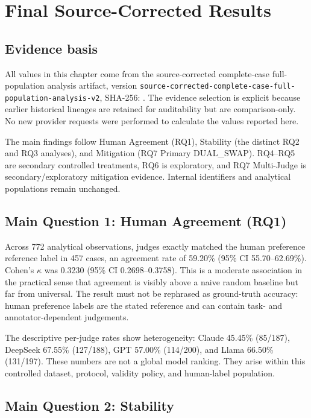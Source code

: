 \chapter{Final Source-Corrected Results}
\label{ch:results}

\section{Evidence basis}

All values in this chapter come from the source-corrected complete-case full-population analysis artifact, version \texttt{source-corrected-complete-case-full-population-analysis-v2}, SHA-256:
\newline {\footnotesize \artifacthash}.
The evidence selection is explicit because earlier historical lineages are retained for auditability but are comparison-only. No new provider requests were performed to calculate the values reported here.

The main findings follow Human Agreement (RQ1), Stability (the distinct RQ2 and RQ3 analyses), and Mitigation (RQ7 Primary DUAL\_SWAP). RQ4--RQ5 are secondary controlled treatments, RQ6 is exploratory, and RQ7 Multi-Judge is secondary/exploratory mitigation evidence. Internal identifiers and analytical populations remain unchanged.

\section{Main Question 1: Human Agreement (RQ1)}

Across 772 analytical observations, judges exactly matched the human preference reference label in 457 cases, an agreement rate of 59.20\% (95\% CI 55.70--62.69\%). Cohen's $\kappa$ was 0.3230 (95\% CI 0.2698--0.3758). This is a moderate association in the practical sense that agreement is visibly above a naive random baseline but far from universal. The result must not be rephrased as ground-truth accuracy: human preference labels are the stated reference and can contain task- and annotator-dependent judgements.

The descriptive per-judge rates show heterogeneity: Claude 45.45\% (85/187), DeepSeek 67.55\% (127/188), GPT 57.00\% (114/200), and Llama 66.50\% (131/197). These numbers are not a global model ranking. They arise within this controlled dataset, protocol, validity policy, and human-label population.

\section{Main Question 2: Stability}
